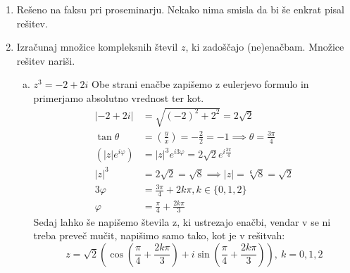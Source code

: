 \documentclass[12pt,a4paper,slovene]{article}
\begin{document}
\begin{enumerate}[(1)]
    \item Rešeno na faksu pri proseminarju. Nekako nima smisla da bi še enkrat pisal rešitev.
    
    \item Izračunaj množice kompleksnih števil $z$, ki zadoščajo (ne)enačbam. Množice rešitev nariši.
    
    \begin{enumerate}[(a)]
        \item $z^3 = -2 + 2i$
        Obe strani enačbe zapišemo z eulerjevo formulo in primerjamo absolutno vrednost ter kot.
        \begin{align*}
            |-2 + 2i| &= \sqrt{(-2)^2 + 2^2} = 2\sqrt{2}\\
            \tan \theta &= \left(\frac{y}{x}\right) = -\frac{2}{2} = -1 \implies \theta = \frac{3\pi}{4}\\
            \left(|z| e^{i \varphi}\right) &= |z|^3 e^{i 3\varphi} = 2\sqrt{2} e^{i\frac{3\pi}{4}}\\
            |z|^3 &= 2\sqrt{2} = \sqrt{8} \implies |z| = \sqrt[6]{8} = \sqrt{2}\\
            3\varphi &= \frac{3\pi}{4} + 2k\pi, k \in \{0, 1, 2\}\\
            \varphi &= \frac{\pi}{4} + \frac{2 k \pi}{3}              
        \end{align*}
        Sedaj lahko še napišemo števila z, ki ustrezajo enačbi, vendar v se ni treba preveč mučit, napišimo samo tako, kot je v rešitvah:
        \[
        z = \sqrt{2}(\cos(\frac{\pi}{4} + \frac{2k\pi}{3}) + i \sin(\frac{\pi}{4} + \frac{2k\pi}{3})),\ k = 0, 1, 2
        \]
        

\end{enumerate}
\end{enumerate}
\end{document}

